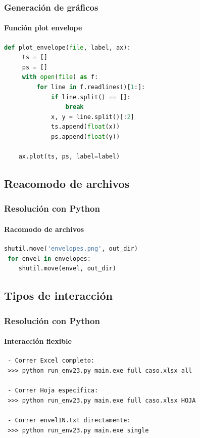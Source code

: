 \documentclass[aspectratio=1610,multi,rgb]{beamer}
\begin{document}
\begin{frame}[c, fragile]
    \frametitle{Generación de gráficos}
    \framesubtitle{Función plot envelope}

\begin{lstlisting}[language=Python]
 def plot_envelope(file, label, ax):
     ts = []
     ps = []
     with open(file) as f:
         for line in f.readlines()[1:]:
             if line.split() == []:
                 break
             x, y = line.split()[:2]
             ts.append(float(x))
             ps.append(float(y))

    ax.plot(ts, ps, label=label)
\end{lstlisting}
\end{frame}


\subsection{Reacomodo de archivos}
\begin{frame}[c, fragile]
    \frametitle{Resolución con Python}
    \framesubtitle{Racomodo de archivos}
    
\begin{lstlisting}[language=Python]
 shutil.move('envelopes.png', out_dir)
 for envel in envelopes:
    shutil.move(envel, out_dir)
\end{lstlisting}
\end{frame}

\subsection{Tipos de interacción}
\begin{frame}[c, fragile]
    \frametitle{Resolución con Python}
    \framesubtitle{Interacción flexible}
\begin{lstlisting}
 - Correr Excel completo: 
 >>> python run_env23.py main.exe full caso.xlsx all
 
 - Correr Hoja específica: 
 >>> python run_env23.py main.exe full caso.xlsx HOJA
 
 - Correr envelIN.txt directamente: 
 >>> python run_env23.py main.exe single
\end{lstlisting}
\end{frame}
\end{document}
